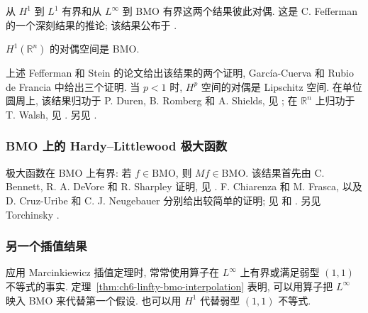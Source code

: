 从 $H^1$ 到 $L^1$ 有界和从 $L^\infty$ 到 BMO 有界这两个结果彼此对偶. 这是 C. Fefferman 的一个深刻结果的推论; 该结果公布于 .

\begin{Theorem}
\label{thm:ch6-h1-dual-bmo}
$H^1(\mathbb R^n)$ 的对偶空间是 BMO.
\end{Theorem}

上述 Fefferman 和 Stein 的论文给出该结果的两个证明, García-Cuerva 和 Rubio de Francia  中给出三个证明. 当 $p<1$ 时, $H^p$ 空间的对偶是 Lipschitz 空间. 在单位圆周上, 该结果归功于 P. Duren, B. Romberg 和 A. Shields, 见 ; 在 $\mathbb R^n$ 上归功于 T. Walsh, 见 . 另见 .

\subsubsection{BMO 上的 Hardy--Littlewood 极大函数}
\label{subsec:ch6-maximal-on-bmo}

极大函数在 BMO 上有界: 若 $f\in\mathrm{BMO}$, 则 $Mf\in\mathrm{BMO}$. 该结果首先由 C. Bennett, R. A. DeVore 和 R. Sharpley 证明, 见 . F. Chiarenza 和 M. Frasca, 以及 D. Cruz-Uribe 和 C. J. Neugebauer 分别给出较简单的证明; 见  和 . 另见 Torchinsky .

\subsubsection{另一个插值结果}
\label{subsec:ch6-another-interpolation}

应用 Marcinkiewicz 插值定理时, 常常使用算子在 $L^\infty$ 上有界或满足弱型 $(1,1)$ 不等式的事实. 定理~\ref{thm:ch6-linfty-bmo-interpolation} 表明, 可以用算子把 $L^\infty$ 映入 BMO 来代替第一个假设. 也可以用 $H^1$ 代替弱型 $(1,1)$ 不等式.

